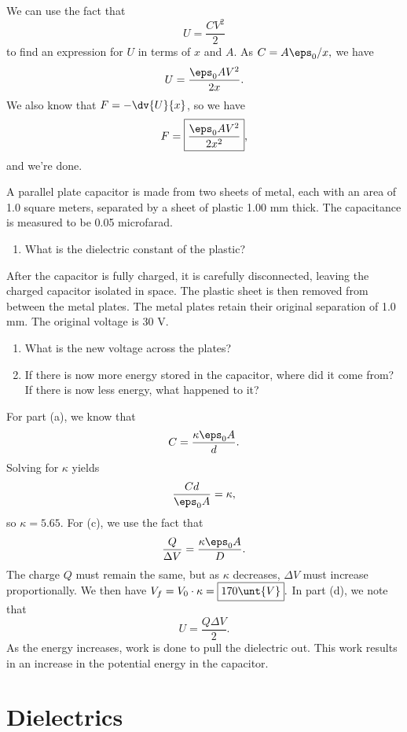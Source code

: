 \documentclass[11pt]{article}
\begin{document}
\begin{solution}
    We can use the fact that
    \[U = \frac{CV^2}{2}\]
    to find an expression for $U$ in terms of $x$ and $A$. As $C = A\eps_0/x,$ we have
    \[U = \frac{\eps_0 AV^2}{2x}.\]
    We also know that $F = -\dv{U}{x}$, so we have
    \[F = \boxed{\frac{\eps_0 AV^2}{2x^2}},\]
    and we're done.
\end{solution}
\begin{example}[1994 AP E2]
    A parallel plate capacitor is made from two sheets of metal, each with an area of 1.0 square meters, separated by a sheet of plastic 1.00 mm thick. The capacitance is measured to be 0.05 microfarad.
    \begin{enumerate}[label=(\alph*)]
        \item What is the dielectric constant of the plastic?
    \end{enumerate}
    After the capacitor is fully charged, it is carefully disconnected, leaving the charged capacitor isolated in space. The plastic sheet is then removed from between the metal plates. The metal plates retain their original separation of 1.0 mm. The original voltage is 30 V.
    \begin{enumerate}[label=(\alph*), resume]
        \item What is the new voltage across the plates?
        \item If there is now more energy stored in the capacitor, where did it come from? If there is now less energy, what happened to it?
    \end{enumerate}
\end{example}
\begin{solution}
    For part (a), we know that
    \[C= \frac{\kappa\eps_0 A}{d}.\]
    Solving for $\kappa$ yields
    \[\frac{Cd}{\eps_0 A} = \kappa,\]
    so $\kappa = \boxed{5.65}$. For (c), we use the fact that
    \[\frac{Q}{\Delta V} = \frac{\kappa\eps_0 A}{D}.\]
    The charge $Q$ must remain the same, but as $\kappa$ decreases, $\Delta V$ must increase proportionally. We then have $V_f = V_0\cdot\kappa = \boxed{170\unt{V}}.$ In part (d), we note that
    \[U = \frac{Q\Delta V}{2}.\]
    As the energy increases, work is done to pull the dielectric out. This work results in an increase in the potential energy in the capacitor.
\end{solution}
\section{Dielectrics}
\end{document}
